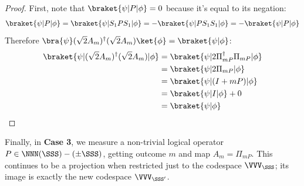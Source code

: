 \begin{proposition}
\begin{proof}
        First, note that $\braket{\psi | P | \phi} = 0$ because it's equal to its negation:
        \begin{equation}\label{eq:P_phi_orthogonal_to_psi}
        \braket{\psi | P | \phi}
        = \braket{\psi | S_1 P S_1| \phi}
        = - \braket{\psi | P S_1 S_1| \phi}
        = - \braket{\psi | P | \phi}
        \end{equation}
        Therefore $\bra{\psi} (\sqrt{2} A_m)^\dagger (\sqrt{2} A_m) \ket{\phi} = \braket{\psi | \phi}$:
        \begin{equation}\label{eq:A_preserves_inner_products}
        \begin{aligned}
            \braket{\psi | (\sqrt{2} A_m)^\dagger (\sqrt{2} A_m) | \phi}
            &= \braket{\psi | 2 \Pi_{mP}^\dagger \Pi_{mP} | \phi} \\
            &= \braket{\psi | 2\Pi_{mP} | \phi} \\
            &= \braket{\psi | (I + mP) | \phi} \\
            &= \braket{\psi | I | \phi} + 0\\
            &= \braket{\psi | \phi} \\
        \end{aligned}
        \end{equation}
    \end{proof}
\end{proposition}

Finally, in \textbf{Case 3}, we measure a non-trivial logical operator $P \in \NNN(\SSS) - (\pm \SSS)$, getting outcome $m$ and map $A_m = \Pi_{mP}$.
This continues to be a projection when restricted just to the codespace $\VVV_\SSS$; its image is exactly the new codespace $\VVV_{\SSS'}$.

